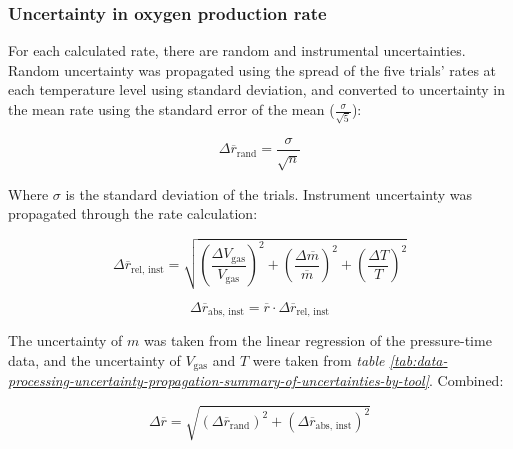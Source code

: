 \documentclass[hyphens]{article}
\begin{document}
\subsubsection{Uncertainty in oxygen production rate}
\indent \indent For each calculated rate, there are random and instrumental uncertainties. Random uncertainty was propagated using the spread of the five trials' rates at each temperature level using standard deviation, and converted to uncertainty in the mean rate using the standard error of the mean ($\frac{\sigma}{\sqrt{5}}$):

\begin{equation}
  \Delta{\overline{r}_\text{rand}} = \frac{\sigma}{\sqrt{n}}
\end{equation}

\noindent Where $\sigma$ is the standard deviation of the trials. Instrument uncertainty was propagated through the rate calculation:

\begin{equation}
  \Delta{\overline{r}_\text{rel, inst}} = \sqrt{(\frac{\Delta{V}_\text{gas}}{V_\text{gas}})^2 + (\frac{\Delta{\overline{m}}}{\overline{m}})^2 + (\frac{\Delta{T}}{T})^2} 
\end{equation}

\begin{equation}
  \Delta{\overline{r}_\text{abs, inst}} = \overline{r} \cdot \Delta{\overline{r}_\text{rel, inst}}
\end{equation}

\noindent The uncertainty of $m$ was taken from the linear regression of the pressure-time data, and the uncertainty of $V_\text{gas}$ and $T$ were taken from \textit{table \ref{tab:data-processing-uncertainty-propagation-summary-of-uncertainties-by-tool}}. Combined:

\begin{equation}
  \Delta{\overline{r}} = \sqrt{(\Delta{\overline{r}_\text{rand}})^2 + (\Delta{\overline{r}_\text{abs, inst}})^2}
\end{equation}
\end{document}
